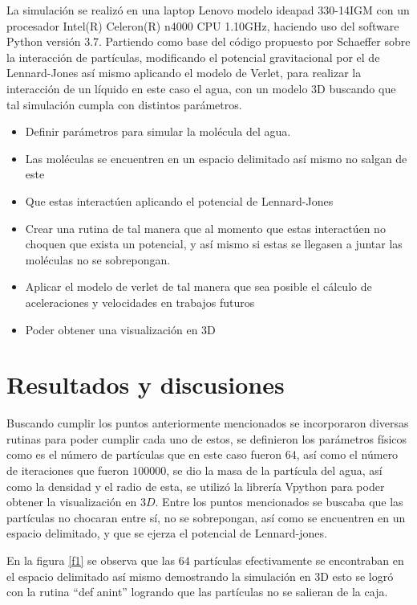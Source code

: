 \documentclass[3pt,twocolumn]{elsarticle}
\begin{document}
La simulación se realizó en una laptop Lenovo modelo ideapad 330-14IGM con un procesador Intel(R) Celeron(R) n4000 CPU 1.10GHz, haciendo uso del software Python \cite{python} versión 3.7. Partiendo como base del código propuesto por Schaeffer \cite{elisa} sobre la interacción de partículas, modificando el potencial gravitacional por el de Lennard-Jones así mismo aplicando el modelo de Verlet, para realizar la interacción de un líquido en este caso el agua, con un modelo 3D buscando que tal simulación cumpla con distintos parámetros.
\begin{itemize}
\item Definir parámetros para simular la molécula del agua.
\item Las moléculas se encuentren en un espacio delimitado así mismo no salgan de este
\item Que estas interactúen aplicando el potencial de Lennard-Jones
\item Crear una rutina de tal manera que al momento que estas interactúen no choquen que exista un potencial, y así mismo si estas se llegasen a juntar las moléculas no se sobrepongan.
\item Aplicar el modelo de verlet de tal manera que sea posible el cálculo de aceleraciones y velocidades en trabajos futuros
\item Poder obtener una visualización en 3D
\end{itemize}


\section{Resultados y discusiones}\label{intr}

Buscando cumplir los puntos anteriormente mencionados se incorporaron diversas rutinas para poder cumplir cada uno de estos, se definieron los parámetros físicos como es el número de partículas que en este caso fueron $64$, así como el número de iteraciones que fueron $100000$, se dio la masa de la partícula del agua, así como la densidad y el radio de esta, se utilizó la librería Vpython para poder obtener la visualización en $3D$.
Entre los puntos mencionados se buscaba que las partículas no chocaran entre sí, no se sobrepongan, así como se encuentren en un espacio delimitado, y que se ejerza el potencial de Lennard-jones.


En la figura \ref{f1} se observa que las $64$ partículas efectivamente se encontraban en el espacio delimitado así mismo demostrando la simulación en 3D esto se logró con la rutina “def anint” \cite{ana} logrando que las partículas no se salieran de la caja.
\end{document}

